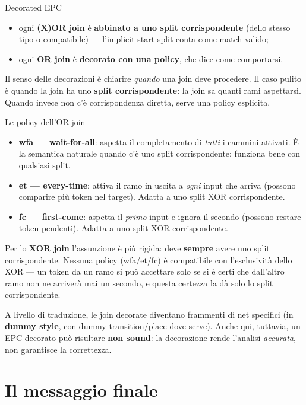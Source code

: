 \begin{boxdefinition}{Decorated EPC}
\begin{itemize}
\item ogni \textbf{(X)OR join} è \textbf{abbinato a uno split corrispondente} (dello stesso tipo o compatibile) — l'implicit start split conta come match valido;
\item ogni \textbf{OR join} è \textbf{decorato con una policy}, che dice come comportarsi.
\end{itemize}
\end{boxdefinition}

Il senso delle decorazioni è chiarire \emph{quando} una join deve procedere. Il caso pulito è quando la join ha uno \textbf{split corrispondente}: la join sa quanti rami aspettarsi. Quando invece non c'è corrispondenza diretta, serve una policy esplicita.

\begin{boxdefinition}{Le policy dell'OR join}
\begin{itemize}
\item \textbf{wfa — wait-for-all}: aspetta il completamento di \emph{tutti} i cammini attivati. È la semantica naturale quando c'è uno split corrispondente; funziona bene con qualsiasi split.
\item \textbf{et — every-time}: attiva il ramo in uscita a \emph{ogni} input che arriva (possono comparire più token nel target). Adatta a uno split XOR corrispondente.
\item \textbf{fc — first-come}: aspetta il \emph{primo} input e ignora il secondo (possono restare token pendenti). Adatta a uno split XOR corrispondente.
\end{itemize}
\end{boxdefinition}

Per lo \textbf{XOR join} l'assunzione è più rigida: deve \textbf{sempre} avere uno split corrispondente. Nessuna policy (wfa/et/fc) è compatibile con l'esclusività dello XOR — un token da un ramo si può accettare solo se si è certi che dall'altro ramo non ne arriverà mai un secondo, e questa certezza la dà solo lo split corrispondente.

A livello di traduzione, le join decorate diventano frammenti di net specifici (in \textbf{dummy style}, con dummy transition/place dove serve). Anche qui, tuttavia, un EPC decorato può risultare \textbf{non sound}: la decorazione rende l'analisi \emph{accurata}, non garantisce la correttezza.

\section{\texorpdfstring{Il messaggio finale}{Il messaggio finale}}

